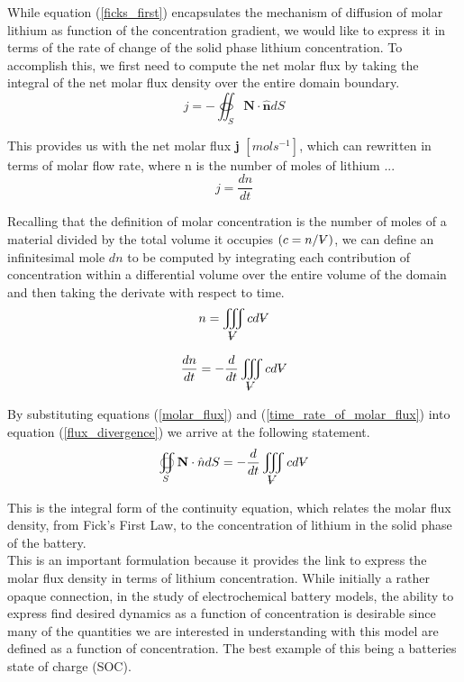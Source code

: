 \documentclass[lettersize,journal]{IEEEtran}
\newcommand{\volume}{{\ooalign{\hfil$V$\hfil\cr\kern0.08em--\hfil\cr}}}
\begin{document}
While equation (\ref{ficks_first}) encapsulates the mechanism of diffusion of molar lithium as function of the concentration gradient, we would like to express it in terms of the rate of change of the solid phase lithium concentration. To accomplish this, we first need to compute the net molar flux by taking the integral of the net molar flux density over the entire domain boundary.
\begin{equation}\label{flux_divergence}
  j = -\oiint_{S} \textbf{N} \cdot \hat{\textbf{n}}dS
\end{equation}

This provides us with the net molar flux \textbf{j} $ [mol s^{-1}]$, which can rewritten in terms of molar flow rate, where n is the number of moles of lithium ...
\begin{equation}\label{molar_flux}
    j = \frac{dn}{dt}
\end{equation}

Recalling that the definition of molar concentration is the number of moles of a material divided by the total volume it occupies $\left( c = n / \volume \right)$, we can define an infinitesimal mole $dn$ to be computed by integrating each contribution of concentration within a differential volume over the entire volume of the domain and then taking the derivate with respect to time.
\begin{equation}
    n = \iiint_{\volume} cd{\volume}
\end{equation}

\begin{equation}\label{time_rate_of_molar_flux}
  \frac{dn}{dt} = -\frac{d}{dt} \iiint_{\volume} cd{\volume}
\end{equation}

\noindent By substituting equations (\ref{molar_flux}) and (\ref{time_rate_of_molar_flux}) into equation (\ref{flux_divergence}) we arrive at the following statement.
\begin{equation}\label{COM_s_int_form}
  \oiint_S \textbf{N} \cdot \hat{n}dS = -\frac{d}{dt} \iiint_{\volume} c d{\volume}
\end{equation}

This is the integral form of the continuity equation, which relates the molar flux density, from Fick's First Law, to the concentration of lithium in the solid phase of the battery. \\

\noindent This is an important formulation because it provides the link to express the molar flux density in terms of lithium concentration. While initially a rather opaque connection, in the study of electrochemical battery models, the ability to express find desired dynamics as a function of concentration is desirable since many of the quantities we are interested in understanding with this model are defined as a function of concentration. The best example of this being a batteries state of charge (SOC). \\
\end{document}
